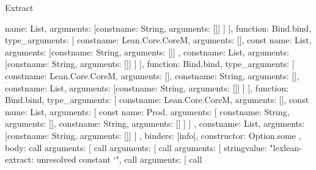 \begin{lexlean}{Extract}
\begin{toolingmodule}
{{{{{{{{{{{{{{                                          name: List,
                                          arguments: [const{name: String, arguments: []}]
                                        }
                                      ]
                                    }
                                  }
                                ],
                                function: Bind.bind,
                                type_arguments: [
                                  const{name: Lean.Core.CoreM, arguments: []},
                                  const{
                                    name: List,
                                    arguments: [const{name: String, arguments: []}]
                                  },
                                  const{name: List, arguments: [const{name: String, arguments: []}]}
                                ]
                              }
                            }
                          ],
                          function: Bind.bind,
                          type_arguments: [
                            const{name: Lean.Core.CoreM, arguments: []},
                            const{name: String, arguments: []},
                            const{name: List, arguments: [const{name: String, arguments: []}]}
                          ]
                        }
                      }
                    ],
                    function: Bind.bind,
                    type_arguments: [
                      const{name: Lean.Core.CoreM, arguments: []},
                      const{
                        name: List,
                        arguments: [
                          const{
                            name: Prod,
                            arguments: [
                              const{name: String, arguments: []},
                              const{name: String, arguments: []}
                            ]
                          }
                        ]
                      },
                      const{name: List, arguments: [const{name: String, arguments: []}]}
                    ]
                  },
                  binders: [info],
                  constructor: Option.some
                },
                {
                  body: call{
                    arguments: [
                      call{
                        arguments: [
                          call{
                            arguments: [
                              string{value: "lexlean-extract: unresolved constant `"},
                              call{
                                arguments: [
                                  call{
}}}}}}}}}}}
\end{toolingmodule}
\end{lexlean}
